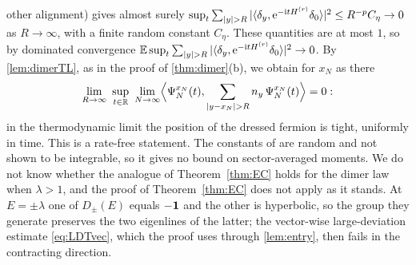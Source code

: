 \begin{remark}
other alignment) gives almost surely
$\sup_t\sum_{|y|>R}|\langle\delta_y,\e^{-\ii tH^{(r)}}\delta_0\rangle|^2\le R^{-p}C_\eta\to0$ as
$R\to\infty$, with a finite random constant $C_\eta$.  These quantities are at most $1$, so by
dominated convergence $\E\sup_t\sum_{|y|>R}|\langle\delta_y,\e^{-\ii tH^{(r)}}\delta_0\rangle|^2\to0$.  By
\cref{lem:dimerTL}, as in the proof of \cref{thm:dimer}(b), we obtain for $x_N$ as there
\[
  \lim_{R\to\infty}\ \sup_{t\in\R}\ \lim_{N\to\infty}\Bigl\langle\Psi^{x_N}_N(t),\sum_{|y-x_N|>R}n_y\,\Psi^{x_N}_N(t)\Bigr\rangle=0 :
\]
in the thermodynamic limit the position of the dressed fermion is tight, uniformly in time.  This is
a rate-free statement.  The constants of \cite{DeBievreGerminet2000} are random and not shown to be
integrable, so it gives no bound on sector-averaged moments.  We do not know whether the analogue of
Theorem~\ref{thm:EC} holds for the dimer law when $\lambda>1$, and the proof of Theorem~\ref{thm:EC}
does not apply as it stands.  At $E=\pm\lambda$ one of $D_\pm(E)$ equals $-\mathbf{1}$ and the other is
hyperbolic, so the group they generate preserves the two eigenlines of the latter; the vector-wise
large-deviation estimate \eqref{eq:LDTvec}, which the proof uses through \cref{lem:entry}, then fails
in the contracting direction.
\end{remark}

